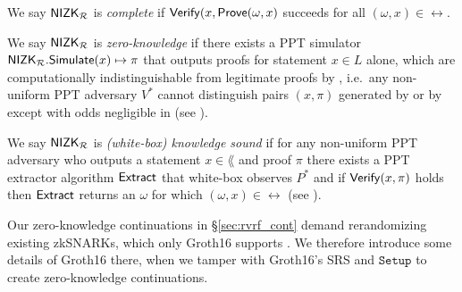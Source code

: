 \begin{definition}\label{def:nizk_completeness}
We say ${\mathsf{NIZK}}_\mathcal{R}$ is {\em complete} if ${\mathsf{Verify}}(x, {\mathsf{Prove}}(\omega,x)$ succeeds for all $(\omega,x) \in \rel$.  %
\end{definition}

\def\advV{\ensuremath{V^*}\xspace} %

\begin{definition}\label{def:nizk_zero_knowledge}
We say ${\mathsf{NIZK}}_\mathcal{R}$ is {\em zero-knowledge} if
there exists a PPT simulator ${\mathsf{NIZK}}_\mathcal{R}.{\mathsf{Simulate}}(x) \mapsto \pi$
that outputs proofs for statement $x \in L$ alone, which are
computationally indistinguishable from legitimate proofs by \Prove,
i.e.\ any non-uniform PPT adversary \advV cannot distinguish pairs $(x,\pi)$
generated by \Simulate or by \Prove except with odds negligible in \secparam
(see \cite[Def. 9, \S A, pap. 29]{RandomizationGroth16}). %
\end{definition}

\def\advP{\ensuremath{P^*}\xspace} %

\begin{definition}\label{def:nizk_knowledge_sound}
We say ${\mathsf{NIZK}}_\mathcal{R}$ is {\em (white-box) knowledge sound} if
for any non-uniform PPT adversary \adv who outputs a statement $x \in \lang$ and proof $\pi$
there exists a PPT extractor algorithm ${\mathsf{Extract}}$ that white-box observes $\advP$ and
if ${\mathsf{Verify}}(x,\pi)$ holds then ${\mathsf{Extract}}$ returns an $\omega$ for which $(\omega,x) \in \rel$
(see \cite[Def. 7, \S A, pap. 29]{RandomizationGroth16}).
\end{definition}

Our zero-knowledge continuations in \S\ref{sec:rvrf_cont} demand
rerandomizing existing zkSNARKs, which only Groth16 supports \cite{Groth16}.
We therefore introduce some details of Groth16 \cite{Groth16} there,
when we tamper with Groth16's SRS and $\mathtt{Setup}$ to create zero-knowledge continuations. 

%

